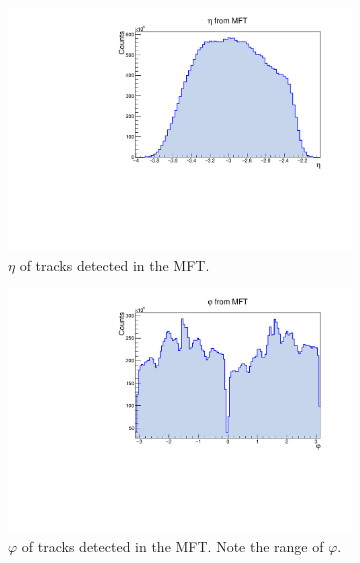 \begin{figure}[h]%
    \centering
    \begin{subfigure}[t]{.49\linewidth}
        \centering
        \includegraphics[width=\linewidth]{Plots/pass3_MFT/MFTeta_pass3.pdf}
        \caption{$\eta$ of tracks detected in the MFT. }
        \label{fig:MFTeta_pass3}
    \end{subfigure}
    \hfill
    \begin{subfigure}[t]{.49\linewidth}
        \centering
        \includegraphics[width=\linewidth]{Plots/pass3_MFT/phi_pass3.pdf}
        \caption{$\varphi$ of tracks detected in the MFT. Note the range of $\varphi$.}
        \label{fig:MFTphi_pass3}
    \end{subfigure}
    \begin{subfigure}[t]{.49\linewidth}

\end{subfigure}
\end{figure}
